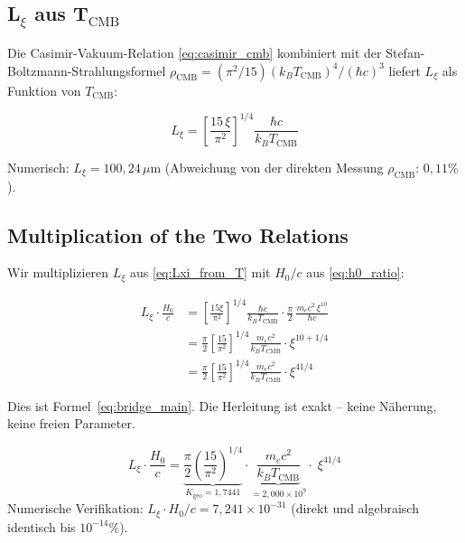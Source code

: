 \subsection{L\texorpdfstring{$_\xi$}{xi} aus T\texorpdfstring{$_\text{CMB}$}{CMB}}

Die Casimir-Vakuum-Relation \eqref{eq:casimir_cmb} kombiniert mit der
Stefan-Boltzmann-Strahlungsformel
$\rho_\text{CMB} = (\pi^2/15)(k_B T_\text{CMB})^4/(\hbar c)^3$
liefert $L_\xi$ als Funktion von $T_\text{CMB}$:

\begin{equation}
    L_\xi = \left[\frac{15\,\xi}{\pi^2}\right]^{1/4}
    \frac{\hbar c}{k_B T_\text{CMB}}
    \label{eq:Lxi_from_T}
\end{equation}

Numerisch: $L_\xi = 100{,}24\,\mu\text{m}$
(Abweichung von der direkten Messung $\rho_\text{CMB}$: $0{,}11\%$).

\subsection{Multiplication of the Two Relations}

Wir multiplizieren $L_\xi$ aus \eqref{eq:Lxi_from_T} mit $H_0/c$ aus
\eqref{eq:h0_ratio}:

\begin{align}
    L_\xi \cdot \frac{H_0}{c}
    &= \left[\frac{15\xi}{\pi^2}\right]^{1/4}
       \frac{\hbar c}{k_B T_\text{CMB}}
       \cdot \frac{\pi}{2}\,\frac{m_e c^2\,\xi^{10}}{\hbar c}
    \nonumber\\[6pt]
    &= \frac{\pi}{2}\left[\frac{15}{\pi^2}\right]^{1/4}
       \frac{m_e c^2}{k_B T_\text{CMB}}
       \cdot \xi^{10 + 1/4}
    \nonumber\\[6pt]
    &= \frac{\pi}{2}\left[\frac{15}{\pi^2}\right]^{1/4}
       \frac{m_e c^2}{k_B T_\text{CMB}}
       \cdot \xi^{41/4}
    \label{eq:bridge_derivation}
\end{align}

Dies ist Formel~\eqref{eq:bridge_main}. Die Herleitung ist exakt -- keine Näherung,
keine freien Parameter.

\begin{keyresult}
    \begin{equation}
        L_\xi \cdot \frac{H_0}{c}
        = \underbrace{\frac{\pi}{2}\left(\frac{15}{\pi^2}\right)^{1/4}}_{K_\text{geo} = 1{,}7441}
        \cdot
        \underbrace{\frac{m_e c^2}{k_B T_\text{CMB}}}_{= 2{,}000 \times 10^9}
        \cdot\; \xi^{41/4}
        \label{eq:bridge_boxed}
    \end{equation}
    Numerische Verifikation: $L_\xi \cdot H_0/c = 7{,}241 \times 10^{-31}$
    (direkt und algebraisch identisch bis $10^{-14}\%$).
\end{keyresult}

